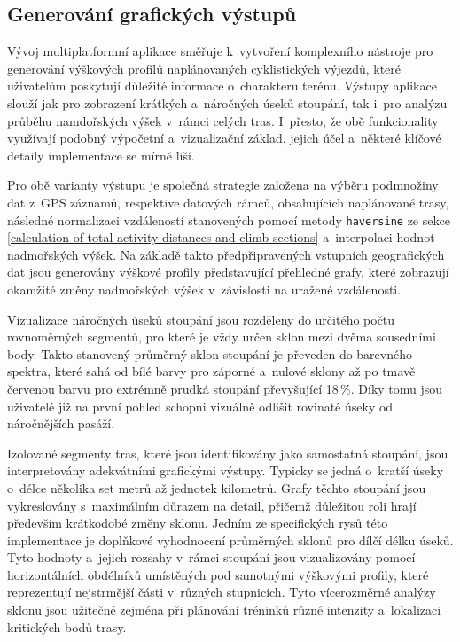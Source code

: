 \subsection{Generování grafických výstupů}
\label{generating-graphical-output}

Vývoj multiplatformní aplikace směřuje k~vytvoření komplexního nástroje pro generování výškových profilů naplánovaných cyklistických výjezdů, které uživatelům poskytují důležité informace o~charakteru terénu.
Výstupy aplikace slouží jak pro zobrazení krátkých a~náročných úseků stoupání, tak i~pro analýzu průběhu namdořských výšek v~rámci celých tras.
I~přesto, že obě funkcionality využívají podobný výpočetní a~vizualizační základ, jejich účel a~některé klíčové detaily implementace se mírně liší.

Pro obě varianty výstupu je společná strategie založena na výběru podmnožiny dat z~GPS záznamů, respektive datových rámců, obsahujících naplánované trasy, následné normalizaci vzdáleností stanovených pomocí metody \texttt{haversine} ze sekce \ref{calculation-of-total-activity-distances-and-climb-sections} a~interpolaci hodnot nadmořských výšek.
Na základě takto předpřipravených vstupních geografických dat jsou generovány výškové profily představující přehledné grafy, které zobrazují okamžité změny nadmořských výšek v~závislosti na uražené vzdálenosti.

Vizualizace náročných úseků stoupání jsou rozděleny do určitého počtu rovnoměrných segmentů, pro které je vždy určen sklon mezi dvěma sousedními body.
Takto stanovený průměrný sklon stoupání je převeden do barevného spektra, které sahá od bílé barvy pro záporné a~nulové sklony až po tmavě červenou barvu pro extrémně prudká stoupání převyšující 18\,\%.
Díky tomu jsou uživatelé již na první pohled schopni vizuálně odlišit rovinaté úseky od náročnějších pasáží.

Izolované segmenty tras, které jsou identifikovány jako samostatná stoupání, jsou interpretovány adekvátními grafickými výstupy.
Typicky se jedná o~kratší úseky o~délce několika set metrů až jednotek kilometrů.
Grafy těchto stoupání jsou vykreslovány s~maximálním důrazem na detail, přičemž důležitou roli hrají především krátkodobé změny sklonu.
Jedním ze specifických rysů této implementace je doplňkové vyhodnocení průměrných sklonů pro dílčí délku úseků.
Tyto hodnoty a~jejich rozsahy v~rámci stoupání jsou vizualizovány pomocí horizontálních obdélníků umístěných pod samotnými výškovými profily, které reprezentují nejstrmější části v~různých stupnicích.
Tyto vícerozměrné analýzy sklonu jsou užitečné zejména při plánování tréninků různé intenzity a~lokalizaci kritických bodů trasy.

